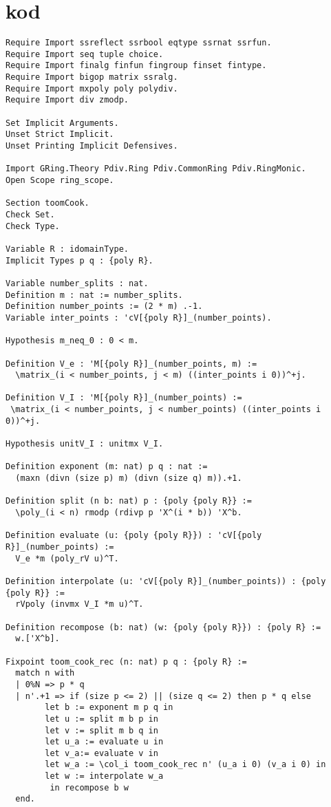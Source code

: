 \section{\coq kod}
\label{sec:coqkod}
\begin{lstlisting}
Require Import ssreflect ssrbool eqtype ssrnat ssrfun.
Require Import seq tuple choice.
Require Import finalg finfun fingroup finset fintype.
Require Import bigop matrix ssralg.
Require Import mxpoly poly polydiv.
Require Import div zmodp.

Set Implicit Arguments.
Unset Strict Implicit.
Unset Printing Implicit Defensives.

Import GRing.Theory Pdiv.Ring Pdiv.CommonRing Pdiv.RingMonic.
Open Scope ring_scope.

Section toomCook.
Check Set.
Check Type.

Variable R : idomainType.
Implicit Types p q : {poly R}.

Variable number_splits : nat.
Definition m : nat := number_splits.
Definition number_points := (2 * m) .-1.
Variable inter_points : 'cV[{poly R}]_(number_points).

Hypothesis m_neq_0 : 0 < m.

Definition V_e : 'M[{poly R}]_(number_points, m) :=
  \matrix_(i < number_points, j < m) ((inter_points i 0))^+j.

Definition V_I : 'M[{poly R}]_(number_points) :=
 \matrix_(i < number_points, j < number_points) ((inter_points i 0))^+j.

Hypothesis unitV_I : unitmx V_I.

Definition exponent (m: nat) p q : nat :=
  (maxn (divn (size p) m) (divn (size q) m)).+1.

Definition split (n b: nat) p : {poly {poly R}} :=
  \poly_(i < n) rmodp (rdivp p 'X^(i * b)) 'X^b.

Definition evaluate (u: {poly {poly R}}) : 'cV[{poly R}]_(number_points) :=
  V_e *m (poly_rV u)^T.

Definition interpolate (u: 'cV[{poly R}]_(number_points)) : {poly {poly R}} :=
  rVpoly (invmx V_I *m u)^T.

Definition recompose (b: nat) (w: {poly {poly R}}) : {poly R} :=
  w.['X^b].

Fixpoint toom_cook_rec (n: nat) p q : {poly R} :=
  match n with
  | 0%N => p * q
  | n'.+1 => if (size p <= 2) || (size q <= 2) then p * q else
        let b := exponent m p q in
        let u := split m b p in
        let v := split m b q in
        let u_a := evaluate u in
        let v_a:= evaluate v in
        let w_a := \col_i toom_cook_rec n' (u_a i 0) (v_a i 0) in
        let w := interpolate w_a
         in recompose b w
  end.


\end{lstlisting}
